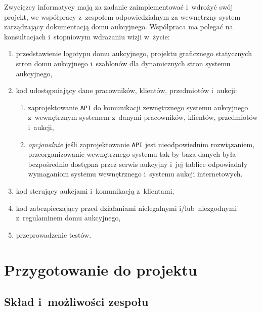 \documentclass[10pt,a4paper]{article}
\begin{document}
Zwycięzcy informatycy mają za zadanie zaimplementować i~wdrożyć swój projekt,
we współpracy z~zespołem odpowiedzialnym za wewnętrzny system zarządzający
dokumentacją domu aukcyjnego. Współpraca ma polegać na konsultacjach
i~stopniowym wdrażaniu wizji w~życie:
\begin{enumerate}
  \item przedstawienie logotypu domu aukcyjnego, projektu graficznego
    statycznych stron domu aukcyjnego i~szablonów dla dynamicznych stron
    systemu aukcyjnego,
  \item kod udostępniający dane pracowników, klientów, przedmiotów i~aukcji:
  \begin{enumerate}
    \item zaprojektowanie \texttt{API} do komunikacji zewnętrznego systemu
      aukcyjnego z~wewnętrznym systemem z~danymi pracowników, klientów,
      przedmiotów i~aukcji,
    \item \emph{opcjonalnie} jeśli zaprojektowanie \texttt{API} jest
      nieodpowiednim rozwiązaniem, przeorganizowanie wewnętrznego systemu tak
      by baza danych była bezpośrednio dostępna przez serwis aukcyjny i~jej
      tablice odpowiadały wymaganiom systemu wewnętrznego i~systemu aukcji
      internetowych.
  \end{enumerate}
  \item kod sterujący aukcjami i~komunikacją z~klientami,
  \item kod zabezpieczający przed działaniami nielegalnymi i/lub~niezgodnymi
    z~regulaminem domu aukcyjnego,
  \item przeprowadzenie testów.
\end{enumerate}

\section{Przygotowanie do projektu}

\subsection{Skład i~możliwości zespołu}

\end{document}
